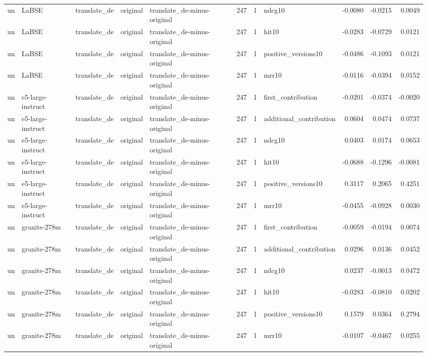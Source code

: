 \begin{tabular}{lllllrrlrrr}
un & LaBSE & translate\_de & original & translate\_de-minus-original & 247 & 1 & ndcg10 & -0.0080 & -0.0215 & 0.0049 \\
un & LaBSE & translate\_de & original & translate\_de-minus-original & 247 & 1 & hit10 & -0.0283 & -0.0729 & 0.0121 \\
un & LaBSE & translate\_de & original & translate\_de-minus-original & 247 & 1 & positive\_versions10 & -0.0486 & -0.1093 & 0.0121 \\
un & LaBSE & translate\_de & original & translate\_de-minus-original & 247 & 1 & mrr10 & -0.0116 & -0.0394 & 0.0152 \\
un & e5-large-instruct & translate\_de & original & translate\_de-minus-original & 247 & 1 & first\_contribution & -0.0201 & -0.0374 & -0.0020 \\
un & e5-large-instruct & translate\_de & original & translate\_de-minus-original & 247 & 1 & additional\_contribution & 0.0604 & 0.0474 & 0.0737 \\
un & e5-large-instruct & translate\_de & original & translate\_de-minus-original & 247 & 1 & ndcg10 & 0.0403 & 0.0174 & 0.0653 \\
un & e5-large-instruct & translate\_de & original & translate\_de-minus-original & 247 & 1 & hit10 & -0.0688 & -0.1296 & -0.0081 \\
un & e5-large-instruct & translate\_de & original & translate\_de-minus-original & 247 & 1 & positive\_versions10 & 0.3117 & 0.2065 & 0.4251 \\
un & e5-large-instruct & translate\_de & original & translate\_de-minus-original & 247 & 1 & mrr10 & -0.0455 & -0.0928 & 0.0030 \\
un & granite-278m & translate\_de & original & translate\_de-minus-original & 247 & 1 & first\_contribution & -0.0059 & -0.0194 & 0.0074 \\
un & granite-278m & translate\_de & original & translate\_de-minus-original & 247 & 1 & additional\_contribution & 0.0296 & 0.0136 & 0.0452 \\
un & granite-278m & translate\_de & original & translate\_de-minus-original & 247 & 1 & ndcg10 & 0.0237 & -0.0013 & 0.0472 \\
un & granite-278m & translate\_de & original & translate\_de-minus-original & 247 & 1 & hit10 & -0.0283 & -0.0810 & 0.0202 \\
un & granite-278m & translate\_de & original & translate\_de-minus-original & 247 & 1 & positive\_versions10 & 0.1579 & 0.0364 & 0.2794 \\
un & granite-278m & translate\_de & original & translate\_de-minus-original & 247 & 1 & mrr10 & -0.0107 & -0.0467 & 0.0255 \\

\end{tabular}
